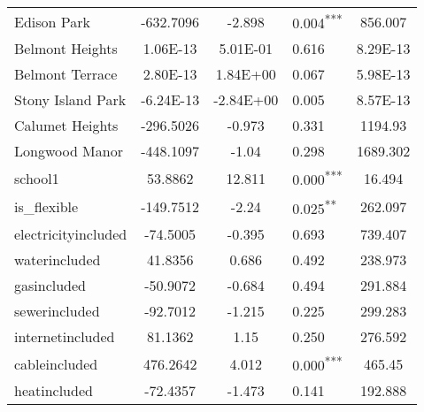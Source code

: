 \documentclass[12pt]{report}
\begin{document}
\begin{longtable}{l S[table-format=6.4] S[table-format=3.4] l S[table-format=4.4]}
	Edison Park                  & -632.7096            & -2.898           & 0.004\textsuperscript{***} & 856.007                           \\
	Belmont Heights              & 1.06E-13             & 5.01E-01         & 0.616                      & 8.29E-13                          \\
	Belmont Terrace              & 2.80E-13             & 1.84E+00         & 0.067                      & 5.98E-13                          \\
	Stony Island Park            & -6.24E-13            & -2.84E+00        & 0.005                      & 8.57E-13                          \\
	Calumet Heights              & -296.5026            & -0.973           & 0.331                      & 1194.93                           \\
	Longwood Manor               & -448.1097            & -1.04            & 0.298                      & 1689.302                          \\
	school1                      & 53.8862              & 12.811           & 0.000\textsuperscript{***} & 16.494                            \\
	is\_flexible                 & -149.7512            & -2.24            & 0.025\textsuperscript{**}  & 262.097                           \\
	electricityincluded          & -74.5005             & -0.395           & 0.693                      & 739.407                           \\
	waterincluded                & 41.8356              & 0.686            & 0.492                      & 238.973                           \\
	gasincluded                  & -50.9072             & -0.684           & 0.494                      & 291.884                           \\
	sewerincluded                & -92.7012             & -1.215           & 0.225                      & 299.283                           \\
	internetincluded             & 81.1362              & 1.15             & 0.250                      & 276.592                           \\
	cableincluded                & 476.2642             & 4.012            & 0.000\textsuperscript{***} & 465.45                            \\
	heatincluded                 & -72.4357             & -1.473           & 0.141                      & 192.888                           \\

\end{longtable}
\end{document}
